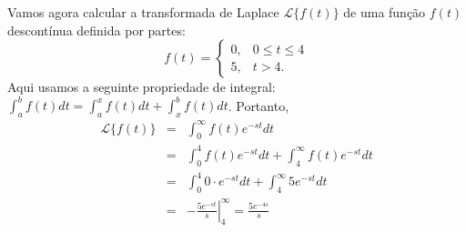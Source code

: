 \begin{ex} Vamos agora calcular a transformada de Laplace $\mathcal{L}\{f(t)\}$ de uma função $f(t)$ descontínua definida por partes:
\begin{equation}
f(t)=\left\{\begin{array}{ll} 0, &0\leq t\leq 4\\ 5, & t> 4.
\end{array}\right.
\end{equation}
Aqui usamos a seguinte propriedade de integral: $\int_a^b f(t)dt=\int_a^x f(t)dt+\int_x^b f(t)dt$. Portanto,
\begin{eqnarray*}
\mathcal{L}\{f(t)\}&=&\int_0^\infty f(t)e^{-st}dt\\
&=&\int_0^4 f(t)e^{-st}dt+\int_4^\infty f(t)e^{-st}dt\\
&=&\int_0^4 0\cdot e^{-st}dt+\int_4^\infty 5 e^{-st}dt\\
&=&\left.-\frac{5e^{-st}}{s}\right|_4^\infty=\frac{5e^{-4s}}{s}
\end{eqnarray*}
\end{ex}

